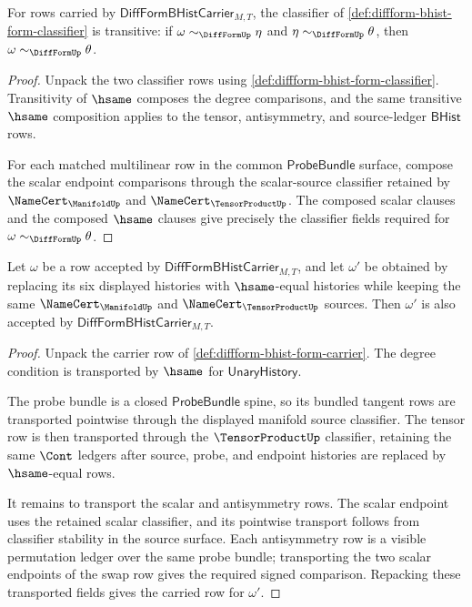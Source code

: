 \begin{theorem}
\label{thm:diffform-classifier-transitivity-obligation}
For rows carried by $\mathsf{DiffFormBHistCarrier}_{M,T}$, the classifier of
\autoref{def:diffform-bhist-form-classifier} is transitive: if
$\omega\sim_{\DiffFormUp}\eta$ and $\eta\sim_{\DiffFormUp}\theta$, then
$\omega\sim_{\DiffFormUp}\theta$.
\end{theorem}
\begin{proof}
Unpack the two classifier rows using
\autoref{def:diffform-bhist-form-classifier}. Transitivity of $\hsame$ composes
the degree comparisons, and the same transitive $\hsame$ composition applies
to the tensor, antisymmetry, and source-ledger $\mathsf{BHist}$ rows.

For each matched multilinear row in the common $\mathsf{ProbeBundle}$ surface,
compose the scalar endpoint comparisons through the scalar-source classifier
retained by $\NameCert_{\ManifoldUp}$ and $\NameCert_{\TensorProductUp}$. The
composed scalar clauses and the composed $\hsame$ clauses give precisely the
classifier fields required for $\omega\sim_{\DiffFormUp}\theta$.
\end{proof}

\begin{theorem}
\label{thm:diffform-carrier-hsame-transport}
Let $\omega$ be a row accepted by
$\mathsf{DiffFormBHistCarrier}_{M,T}$, and let $\omega'$ be obtained by
replacing its six displayed histories with $\hsame$-equal histories while
keeping the same $\NameCert_{\ManifoldUp}$ and $\NameCert_{\TensorProductUp}$
sources. Then $\omega'$ is also accepted by
$\mathsf{DiffFormBHistCarrier}_{M,T}$.
\end{theorem}
\begin{proof}
Unpack the carrier row of \autoref{def:diffform-bhist-form-carrier}. The
degree condition is transported by $\hsame$ for $\mathsf{UnaryHistory}$.

The probe bundle is a closed $\mathsf{ProbeBundle}$ spine, so its bundled
tangent rows are transported pointwise through the displayed manifold source
classifier. The tensor row is then transported through the
$\TensorProductUp$ classifier, retaining the same $\Cont$ ledgers after
source, probe, and endpoint histories are replaced by $\hsame$-equal rows.

It remains to transport the scalar and antisymmetry rows. The scalar endpoint
uses the retained scalar classifier, and its pointwise transport follows from
classifier stability in the source surface. Each antisymmetry row is a visible
permutation ledger over the same probe bundle; transporting the two scalar
endpoints of the swap row gives the required signed comparison. Repacking
these transported fields gives the carried row for $\omega'$.
\end{proof}

